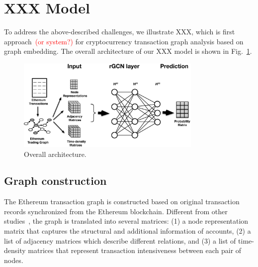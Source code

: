 
\section{XXX Model}
\label{sec:model}
To address the above-described challenges, we illustrate XXX, which is first approach~\textcolor{red}{(or system?)} for cryptocurrency transaction graph analysis based on graph embedding. The overall architecture of our XXX model is shown in Fig.~\ref{fig:architecture}. 

\begin{figure}[htbp]
	\centering
	\includegraphics[width=3.5in]{fig/architecture.eps}
	\caption{Overall architecture.}
	\label{fig:architecture}
\end{figure}


\subsection{Graph construction}
\label{sec:input}
The Ethereum transaction graph is constructed based on original transaction records synchronized from the Ethereum blockchain. Different from other studies~\cite{kipf2016semi,schlichtkrull2018modeling}, the graph is translated into several matrices: (1) a node representation matrix that captures the structural and additional information of accounts, (2) a list of adjacency matrices which describe different relations, and (3) a list of time-density matrices that represent transaction intensiveness between each pair of nodes.


